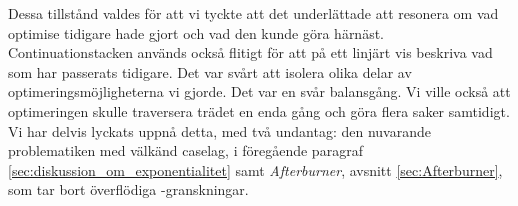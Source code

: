 \documentclass[Rapport]{subfiles}
\begin{document}
Dessa tillstånd valdes för att vi tyckte att det underlättade att resonera
om vad optimise tidigare hade gjort och vad den kunde göra härnäst. 
Continuationstacken används också flitigt för att på
ett linjärt vis beskriva vad som har passerats tidigare.
Det var svårt att isolera olika delar av optimeringsmöjligheterna vi gjorde.
Det var en svår balansgång. Vi ville också 
att optimeringen skulle traversera trädet en enda gång och göra flera
saker samtidigt. Vi har delvis lyckats uppnå detta, med två undantag: den nuvarande problematiken med välkänd caselag, i 
föregående paragraf \ref{sec:diskussion_om_exponentialitet} samt 
\emph{Afterburner}, avsnitt \ref{sec:Afterburner}, 
som tar bort överflödiga -granskningar.
\end{document}
